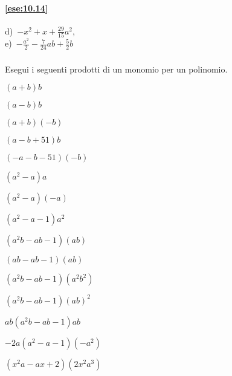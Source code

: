 \paragraph{\ref{ese:10.14}} d)~\(-x^{2}+x+\frac{29}{15}a^{2}\),\protect\\ 
e)~\(-{\frac{a^{2}}{2}}-\frac{7}{24}ab+\frac{5}{2}b\)

\subsubsection*{}

\begin{esercizio}
\label{ese:10.15}
 Esegui i seguenti prodotti di un monomio per un polinomio.
 \begin{multicols}{3}
\begin{enumeratea}
 \item \((a + b)b\)
 \item \((a - b)b\)
 \item \((a +b)(-b)\)
 \item \((a - b + 51)b\)
 \item \((-a - b -51)(-b)\)
 \item \((a^{2} - a)a\)
 \item \((a^{2} - a)(-a)\)
 \item \((a^{2}- a - 1)a^{2}\)
 \item \((a^{2}b-ab - 1)(ab)\)
 \item \((ab- ab - 1)(ab)\)
 \item \((a^{2}b- ab -1)(a^{2}b^{2})\)
 \item \((a^{2}b-ab - 1)(ab)^{2}\)
 \item \(ab(a^{2}b- ab -1)ab\)
 \item \(-2a(a^{2} - a - 1)(-a^{2})\)
 \item \((x^{2}a- ax+2)(2x^{2}a^{3})\)
\end{enumeratea}
\end{multicols}
\end{esercizio}

